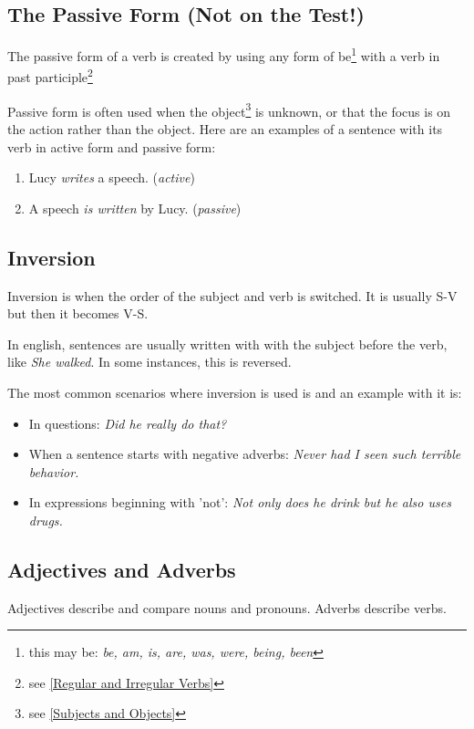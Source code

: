 \newpage
\subsection{The Passive Form (Not on the Test!)}
\begin{definition}
    The passive form of a verb is created by using any form of be\footnote{this may be: \textit{be, am, is, are, was, were, being, been}} with a verb in past participle\footnote{see \ref{Regular and Irregular Verbs}}
\end{definition}
Passive form is often used when the object\footnote{see \ref{Subjects and Objects}} is unknown, or that the focus is on the action rather than the object. Here are an examples of a sentence with its verb in active form and passive form:

\begin{enumerate}
    \item Lucy \textit{writes} a speech. (\textit{active})
    \item A speech \textit{is written} by Lucy. (\textit{passive})
\end{enumerate}

\newpage
\subsection{Inversion}
\begin{definition}[Inversion]
    Inversion is when the order of the subject and verb is switched. It is usually S-V but then it becomes V-S.
\end{definition}
In english, sentences are usually written with with the subject before the verb, like \textit{She walked}. In some instances, this is reversed.

The most common scenarios where inversion is used is and an example with it is:
\begin{itemize}
    \item In questions: \textit{Did he really do that?}
    \item When a sentence starts with negative adverbs: \textit{Never had I seen such terrible behavior.}
    \item In expressions beginning with 'not': \textit{Not only does he drink but he also uses drugs.} 
\end{itemize}

\newpage
\subsection{Adjectives and Adverbs}
\begin{definition}
    Adjectives describe and compare nouns and pronouns. Adverbs describe verbs.
\end{definition}


